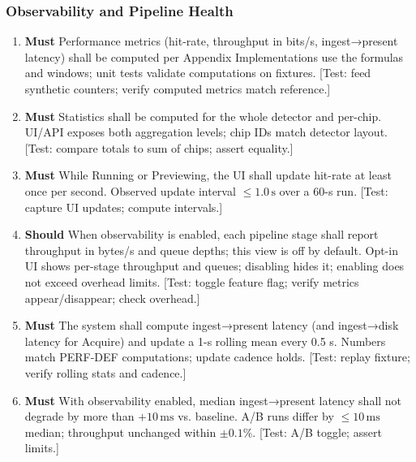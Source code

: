 \documentclass[12pt]{article}
\newcommand{\PriorityTag}[2]{%
  \colorbox{#2!25}{\footnotesize\textsf{\textbf{#1}}}\hspace{0.6em}}
\newcommand{\must}{\leavevmode\PriorityTag{Must}{green}}
\newcommand{\should}{\leavevmode\PriorityTag{Should}{yellow}}
\newcounter{reqgrp}[section] %
\newcounter{reqno}
\newcommand{\reqprefix}{GEN}
\newenvironment{requirements}[1]{%
  \renewcommand{\reqprefix}{#1}%
  \refstepcounter{reqgrp}%
  \setcounter{reqno}{0}%
  \begin{enumerate}[leftmargin=*]
}{\end{enumerate}}
\begin{document}
\subsubsection{Observability and Pipeline Health}
\begin{requirements}{OBS}

\item \must {}
  {Performance metrics (hit-rate, throughput in bits/s, ingest→present latency) shall be computed per Appendix }
  {Implementations use the formulas and windows; unit tests validate computations on fixtures.}
  [Test: feed synthetic counters; verify computed metrics match reference.]

\item \must {}
  {Statistics shall be computed for the whole detector and per-chip.}
  {UI/API exposes both aggregation levels; chip IDs match detector layout.}
  [Test: compare totals to sum of chips; assert equality.]

\item \must {}
  {While Running or Previewing, the UI shall update hit-rate at least once per second.}
  {Observed update interval \(\le 1.0\,\mathrm{s}\) over a 60-s run.}
  [Test: capture UI updates; compute intervals.]

\item \should {}
  {When observability is enabled, each pipeline stage shall report throughput in bytes/s and queue depths; this view is off by default.}
  {Opt-in UI shows per-stage throughput and queues; disabling hides it; enabling does not exceed overhead limits.}
  [Test: toggle feature flag; verify metrics appear/disappear; check overhead.]

\item \must {}
  {The system shall compute ingest→present latency (and ingest→disk latency for Acquire) and update a 1-s rolling mean every 0.5 s.}
  {Numbers match PERF-DEF computations; update cadence holds.}
  [Test: replay fixture; verify rolling stats and cadence.]

\item \must {}
  {With observability enabled, median ingest→present latency shall not degrade by more than \(+10\,\mathrm{ms}\) vs. baseline.}
  {A/B runs differ by \(\le 10\,\mathrm{ms}\) median; throughput unchanged within \(\pm 0.1\%\).}
  [Test: A/B toggle; assert limits.]


\end{requirements}
\end{document}
